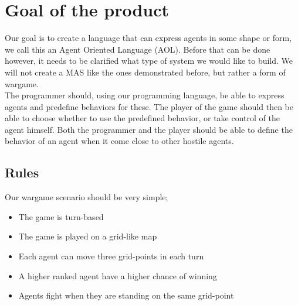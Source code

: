 \chapter{Goal of the product}

Our goal is to create a language that can express agents in some shape or form, we call this an Agent Oriented Language (AOL). Before that can be done however, it needs to be clarified what type of system we would like to build. We will not create a MAS like the ones demonstrated before, but rather a form of wargame.\\
\indent The programmer should, using our programming language, be able to express agents and predefine behaviors for these. The player of the game should then be able to choose whether to use the predefined behavior, or take control of the agent himself. Both the programmer and the player should be able to define the behavior of an agent when it come close to other hostile agents. \\

\section{Rules}
Our wargame scenario should be very simple;
\begin{itemize}
	\item The game is turn-based
	\item The game is played on a grid-like map
	\item Each agent can move three grid-points in each turn
	\item A higher ranked agent have a higher chance of winning
	\item Agents fight when they are standing on the same grid-point
\end{itemize}